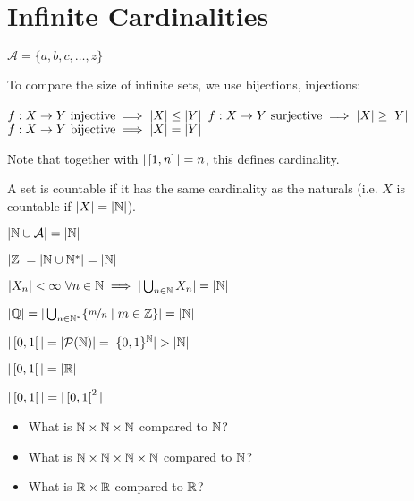 \chapter{Infinite Cardinalities}
\begin{definition}[Alphabet]
	$\mathcal{A} = \{ a,b,c, \dots, z \}$
\end{definition}
To compare the size of infinite sets, we use bijections, injections:
\begin{definition}
	$f: X \to Y \text{ injective} \implies | X | \leq | Y |$
	$f: X \to Y \text{ surjective} \implies | X | \geq | Y |$
	$f: X \to Y \text{ bijective} \implies | X | = | Y |$
\end{definition}
Note that together with $| \left[ 1,n \right] |=n$, this defines cardinality.
\begin{definition}
	A set is countable if it has the same cardinality as the naturals (i.e. $X$ is countable if $| X | = | \mathbb{N} |$).
\end{definition}

\begin{property}
	$| \mathbb{N} \cup \mathcal{A} | = | \mathbb{N} |$
\end{property}
\begin{property}
	$| \mathbb{Z} | = | \mathbb{N} \cup \mathbb{N}^* | = | \mathbb{N} |$
\end{property}
\begin{property}
	$| X_n |<\infty \ \forall n \in \mathbb{N} \implies | \bigcup_{n \in \mathbb{N}} X_n | = | \mathbb{N} |$
\end{property}
\begin{property}
	$| \mathbb{Q} | = | \bigcup_{n \in \mathbb{N}^*} \{ \nicefrac{m}{n} \mid m \in \mathbb{Z} \} | = | \mathbb{N} |$
\end{property}
\begin{property}
	$|  \left[ 0,1 \right[  | = | \mathcal{P}(\mathbb{N}) | = | \{0,1\}^{\mathbb{N}} | > | \mathbb{N} |$
\end{property}
\begin{property}
	$|  \left[ 0,1 \right[  | = |  \mathbb{R}  |$
\end{property}
\begin{property}
	$|  \left[ 0,1 \right[  | = |  \left[ 0,1 \right[^2  |$
\end{property}

\begin{question}
	\begin{itemize}
		\item What is $\mathbb{N} \times \mathbb{N} \times \mathbb{N}$ compared to $\mathbb{N}$?
		\item What is $\mathbb{N} \times \mathbb{N} \times \mathbb{N} \times \mathbb{N}$ compared to $\mathbb{N}$?
		\item What is $\mathbb{R} \times \mathbb{R}$ compared to $\mathbb{R}$?
	\end{itemize}
\end{question}



